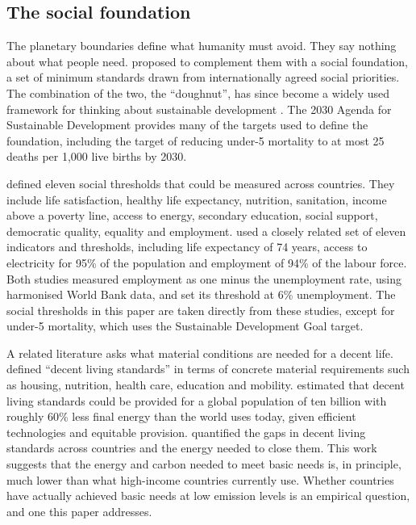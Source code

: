 \subsection{The social foundation}

The planetary boundaries define what humanity must avoid. They say nothing about what people need. \citet{raworth2012} proposed to complement them with a social foundation, a set of minimum standards drawn from internationally agreed social priorities. The combination of the two, the ``doughnut'', has since become a widely used framework for thinking about sustainable development \citep{raworth2017}. The 2030 Agenda for Sustainable Development \citep{un2015sdg} provides many of the targets used to define the foundation, including the target of reducing under-5 mortality to at most 25 deaths per 1{,}000 live births by 2030.

\citet{oneill2018} defined eleven social thresholds that could be measured across countries. They include life satisfaction, healthy life expectancy, nutrition, sanitation, income above a poverty line, access to energy, secondary education, social support, democratic quality, equality and employment. \citet{fanning2022} used a closely related set of eleven indicators and thresholds, including life expectancy of 74 years, access to electricity for 95\% of the population and employment of 94\% of the labour force. Both studies measured employment as one minus the unemployment rate, using harmonised World Bank data, and set its threshold at 6\% unemployment. The social thresholds in this paper are taken directly from these studies, except for under-5 mortality, which uses the Sustainable Development Goal target.

A related literature asks what material conditions are needed for a decent life. \citet{rao2018} defined ``decent living standards'' in terms of concrete material requirements such as housing, nutrition, health care, education and mobility. \citet{millwardhopkins2020} estimated that decent living standards could be provided for a global population of ten billion with roughly 60\% less final energy than the world uses today, given efficient technologies and equitable provision. \citet{kikstra2021} quantified the gaps in decent living standards across countries and the energy needed to close them. This work suggests that the energy and carbon needed to meet basic needs is, in principle, much lower than what high-income countries currently use. Whether countries have actually achieved basic needs at low emission levels is an empirical question, and one this paper addresses.

